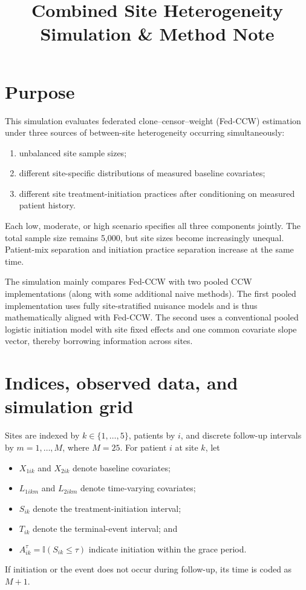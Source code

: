 \documentclass[11pt]{article}
\title{Combined Site Heterogeneity\\
Simulation \& Method Note}
\author{}
\date{}
\newcommand{\ind}{\mathbb{I}}
\begin{document}
\maketitle

\section{Purpose}

This simulation evaluates federated clone--censor--weight (Fed-CCW) estimation
under three sources of between-site heterogeneity occurring simultaneously:
\begin{enumerate}[leftmargin=2em]
  \item unbalanced site sample sizes;
  \item different site-specific distributions of measured baseline
        covariates;
  \item different site treatment-initiation practices after
        conditioning on measured patient history.
\end{enumerate}
Each low, moderate, or high scenario specifies all three components jointly.
The total sample size remains 5,000, but site sizes become increasingly unequal. 
Patient-mix separation and initiation practice separation increase at the same time.

The simulation mainly compares Fed-CCW with two pooled CCW implementations (along with some additional naive methods). 
The first pooled implementation uses fully site-stratified nuisance models and is thus mathematically aligned with Fed-CCW. 
The second uses a conventional pooled logistic initiation model with site fixed effects and one common covariate slope vector, thereby borrowing information across sites.


\section{Indices, observed data, and simulation grid}

Sites are indexed by $k\in\{1,\ldots,5\}$, patients by $i$, and discrete
follow-up intervals by $m=1,\ldots,M$, where $M=25$. For patient $i$ at site
$k$, let
\begin{itemize}[leftmargin=2em]
  \item $X_{1ik}$ and $X_{2ik}$ denote baseline covariates;
  \item $L_{1ikm}$ and $L_{2ikm}$ denote time-varying covariates;
  \item $S_{ik}$ denote the treatment-initiation interval;
  \item $T_{ik}$ denote the terminal-event interval; and
  \item $A_{ik}^{\tau}=\ind(S_{ik}\leq\tau)$ indicate initiation within the
        grace period.
\end{itemize}
If initiation or the event does not occur during follow-up, its time is coded
as $M+1$.
\end{document}
